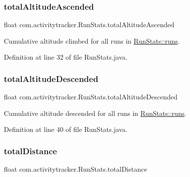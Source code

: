 \subsubsection{\texorpdfstring{total\+Altitude\+Ascended}{totalAltitudeAscended}}
{\footnotesize\ttfamily float com.\+activitytracker.\+Run\+Stats.\+total\+Altitude\+Ascended\hspace{0.3cm}{\ttfamily [private]}}

Cumulative altitude climbed for all runs in \mbox{\hyperlink{classcom_1_1activitytracker_1_1_run_stats_a0fd429e9f463ddf4897c507c0e3c0a12}{Run\+Stats\+::runs}}. 

Definition at line 32 of file Run\+Stats.\+java.

\mbox{\label{classcom_1_1activitytracker_1_1_run_stats_ae511b3772f61773885d0178b215786d7}} 
\subsubsection{\texorpdfstring{total\+Altitude\+Descended}{totalAltitudeDescended}}
{\footnotesize\ttfamily float com.\+activitytracker.\+Run\+Stats.\+total\+Altitude\+Descended\hspace{0.3cm}{\ttfamily [private]}}

Cumulative altitude descended for all runs in \mbox{\hyperlink{classcom_1_1activitytracker_1_1_run_stats_a0fd429e9f463ddf4897c507c0e3c0a12}{Run\+Stats\+::runs}}. 

Definition at line 40 of file Run\+Stats.\+java.

\mbox{\label{classcom_1_1activitytracker_1_1_run_stats_a2e9486ea214a828e9f58489fd2b1a718}} 
\subsubsection{\texorpdfstring{total\+Distance}{totalDistance}}
{\footnotesize\ttfamily float com.\+activitytracker.\+Run\+Stats.\+total\+Distance\hspace{0.3cm}{\ttfamily [private]}}

